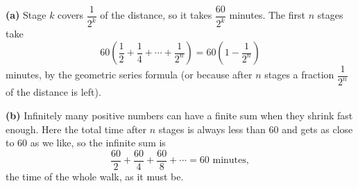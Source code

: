 \textbf{(a)} Stage $k$ covers $\dfrac1{2^k}$ of the distance, so it takes $\dfrac{60}{2^k}$ minutes. The first $n$ stages take
\[60\left(\dfrac12+\dfrac14+\cdots+\dfrac1{2^n}\right)=60\left(1-\dfrac1{2^n}\right)\]
minutes, by the geometric series formula (or because after $n$ stages a fraction $\dfrac1{2^n}$ of the distance is left).

\textbf{(b)} Infinitely many positive numbers can have a finite sum when they shrink fast enough. Here the total time after $n$ stages is always less than $60$ and gets as close to $60$ as we like, so the infinite sum is
\[\dfrac{60}2+\dfrac{60}4+\dfrac{60}8+\cdots=\boxed{60\text{ minutes}},\]
the time of the whole walk, as it must be.
